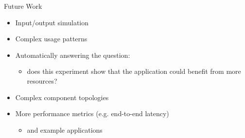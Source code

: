 \documentclass{beamer}
\begin{document}
\begin{frame}{Future Work}
  \begin{itemize}
  \item Input/output simulation
  \item Complex usage patterns
  \item Automatically answering the question:
    \begin{itemize}
    \item does this experiment show that the application could benefit from more
      resources?
    \end{itemize}
  \item Complex component topologies
  \item More performance metrics (e.g. end-to-end latency)
    \begin{itemize}
    \item and example applications
    \end{itemize}
  \end{itemize}
\end{frame}

\end{document}

